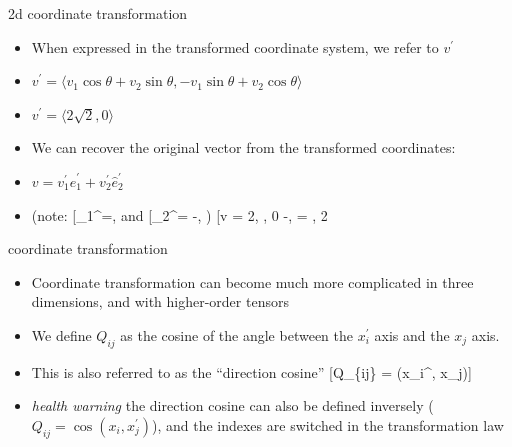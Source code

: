 \documentclass[12pt,handout]{beamer}
\providecommand{\tightlist}{%
  \setlength{\itemsep}{0pt}\setlength{\parskip}{0pt}}
\begin{document}
\begin{frame}{2d coordinate transformation}
\protect\hypertarget{d-coordinate-transformation-5}{}
\begin{itemize}
\tightlist
\item
  When expressed in the transformed coordinate system, we refer to
  \(v^\prime\)
\item
  \(v^\prime = \langle v_1 \cos \theta + v_2 \sin \theta, -v_1 \sin \theta + v_2 \cos \theta \rangle\)
\item
  \(v^\prime = \langle 2\sqrt{2}, 0 \rangle\)
\item
  We can recover the original vector from the transformed coordinates:
\item
  \(v = v_1^\prime \hat{e}_1^\prime + v_2^\prime \hat{e}_2^\prime\)
\item
  (note:
  {[}\_1\^{}\prime=\langle {},
  \rangle{]} and {[}\_2\^{}\prime =
  \langle -, \rangle{]}) {[}v =
  2\langle {}, \rangle, 0
  \langle -, \rangle = , 2
  \rangle{]}
\end{itemize}
\end{frame}

\begin{frame}{coordinate transformation}
\protect\hypertarget{coordinate-transformation}{}
\begin{itemize}
\tightlist
\item
  Coordinate transformation can become much more complicated in three
  dimensions, and with higher-order tensors
\item
  We define \(Q_{ij}\) as the cosine of the angle between the
  \(x_i^\prime\) axis and the \(x_j\) axis.
\item
  This is also referred to as the ``direction cosine'' {[}Q\_\{ij\} =
  \cos (x\_i\^{}\prime, x\_j){]}
\item
  \emph{health warning} the direction cosine can also be defined
  inversely (\(Q_{ij} =\cos (x_i, x_j^\prime)\)), and the indexes are
  switched in the transformation law
\end{itemize}
\end{frame}
\end{document}
